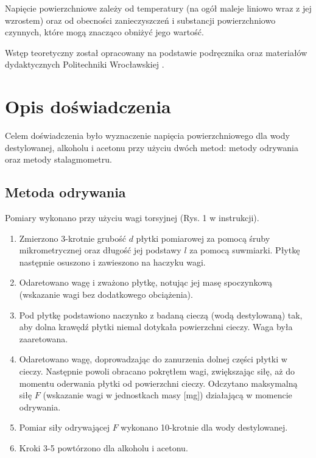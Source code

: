 \documentclass[a4paper,12pt]{article}
\begin{document}
Napięcie powierzchniowe zależy od temperatury (na ogół maleje liniowo wraz z jej wzrostem) oraz od obecności zanieczyszczeń i substancji powierzchniowo czynnych, które mogą znacząco obniżyć jego wartość.

Wstęp teoretyczny został opracowany na podstawie podręcznika \cite{fizyka_dla_szkół_wyższych_tom_2} oraz materiałów dydaktycznych Politechniki Wrocławskiej \cite{lab12_pwr}.

\section{Opis doświadczenia}

Celem doświadczenia było wyznaczenie napięcia powierzchniowego dla wody destylowanej, alkoholu i acetonu przy użyciu dwóch metod: metody odrywania oraz metody stalagmometru.

\subsection{Metoda odrywania}

Pomiary wykonano przy użyciu wagi torsyjnej (Rys. 1 w instrukcji).
\begin{enumerate}
    \item Zmierzono 3-krotnie grubość $d$ płytki pomiarowej za pomocą śruby mikrometrycznej oraz długość jej podstawy $l$ za pomocą suwmiarki. Płytkę następnie osuszono i zawieszono na haczyku wagi.
    \item Odaretowano wagę i zważono płytkę, notując jej masę spoczynkową (wskazanie wagi bez dodatkowego obciążenia).
    \item Pod płytkę podstawiono naczynko z badaną cieczą (wodą destylowaną) tak, aby dolna krawędź płytki niemal dotykała powierzchni cieczy. Waga była zaaretowana.
    \item Odaretowano wagę, doprowadzając do zanurzenia dolnej części płytki w cieczy. Następnie powoli obracano pokrętłem wagi, zwiększając siłę, aż do momentu oderwania płytki od powierzchni cieczy. Odczytano maksymalną siłę $F$ (wskazanie wagi w jednostkach masy [mg]) działającą w momencie odrywania.
    \item Pomiar siły odrywającej $F$ wykonano 10-krotnie dla wody destylowanej.
    \item Kroki 3-5 powtórzono dla alkoholu i acetonu.
\end{enumerate}
\end{document}
